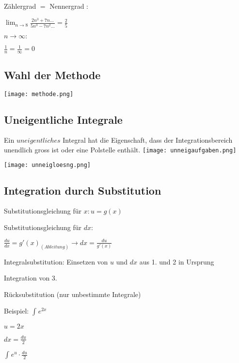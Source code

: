 \begin{multicols*}{3}
    {Zählergrad $=$ Nennergrad : }

    {\large $  \lim_{n\to 8} \frac{2n^3+7n...}{5n^3-7n^2...} = \frac{2}{5}$}
    \WhiteSpace

    {$n \to \infty:$}

    {\large  $ \frac{1}{n} = \frac{1}{\infty} = 0$}
    \WhiteSpace




    \subsection{Wahl der Methode}

    \texttt{[image: methode.png]}

    \subsection{Uneigentliche Integrale}
    { Ein $uneigentliches$ Integral hat die Eigenschaft, dass der Integrationsbereich unendlich gross
        ist oder eine Polstelle enthält.}
    \texttt{[image: unneigaufgaben.png]}

    \texttt{[image: unneigloesng.png]}



    \vfill\null
    \columnbreak
    \subsection{Integration durch Substitution}
    { Substitutionsgleichung für $x: u = g(x)$}

    { Substitutionsgleichung für $dx:$}

    $ \frac{du}{dx} = g'(x)_{(Ableitung)} \to dx = \frac{du}{g'(x)}$

    { Integralsubstitution: Einsetzen von $ u $ und $ dx $ aus 1. und 2 in Ursprung}

        { Integration von 3.}

        { Rücksubstitution (nur unbestimmte Integrale)}


    \begin{multicols*}{2}
        {Beispiel:}
        $\int_{}^{}e^{2x} $

        \columnbreak

        { $ u = 2x $}

        { $ dx = \frac{du}{2} $}

        { $ \int_{}{}e^u \cdot  \frac{du}{2} $}


\end{multicols*}
\end{multicols*}
